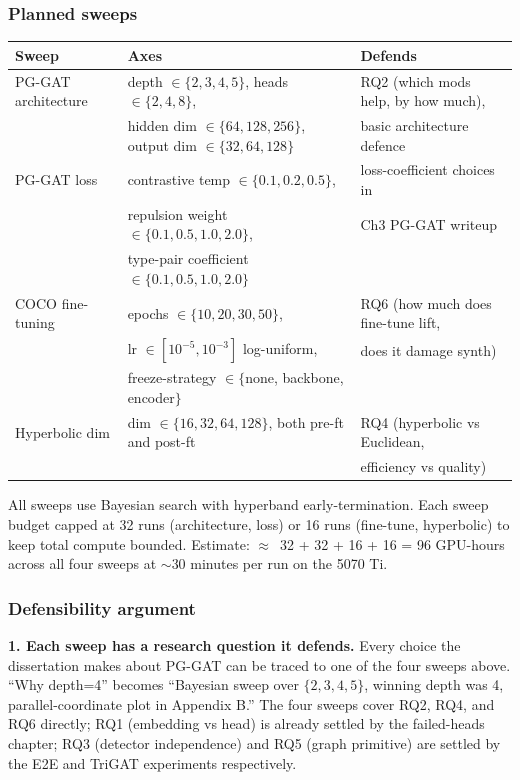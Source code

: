 \subsubsection{Planned sweeps}

\begin{tabular}{lll}
\hline
\textbf{Sweep} & \textbf{Axes} & \textbf{Defends} \\
\hline
PG-GAT architecture & depth $\in \{2,3,4,5\}$, heads $\in \{2,4,8\}$, & RQ2 (which mods help, by how much), \\
                    & hidden dim $\in \{64,128,256\}$, output dim $\in \{32,64,128\}$ & basic architecture defence \\
PG-GAT loss        & contrastive temp $\in \{0.1, 0.2, 0.5\}$, & loss-coefficient choices in \\
                    & repulsion weight $\in \{0.1, 0.5, 1.0, 2.0\}$, & Ch3 PG-GAT writeup \\
                    & type-pair coefficient $\in \{0.1, 0.5, 1.0, 2.0\}$ & \\
COCO fine-tuning   & epochs $\in \{10,20,30,50\}$, & RQ6 (how much does fine-tune lift, \\
                    & lr $\in [10^{-5}, 10^{-3}]$ log-uniform, & does it damage synth) \\
                    & freeze-strategy $\in \{$none, backbone, encoder$\}$ & \\
Hyperbolic dim     & dim $\in \{16, 32, 64, 128\}$, both pre-ft and post-ft & RQ4 (hyperbolic vs Euclidean,  \\
                    & & efficiency vs quality)\\
\hline
\end{tabular}

\vspace{0.5em}

All sweeps use Bayesian search with hyperband early-termination. Each sweep budget capped at 32 runs (architecture, loss) or 16 runs (fine-tune, hyperbolic) to keep total compute bounded. Estimate: $\approx$~32 + 32 + 16 + 16 = 96 GPU-hours across all four sweeps at $\sim$30 minutes per run on the 5070 Ti.

\subsubsection{Defensibility argument}

\textbf{1. Each sweep has a research question it defends.} Every choice the dissertation makes about PG-GAT can be traced to one of the four sweeps above. ``Why depth=4'' becomes ``Bayesian sweep over $\{2,3,4,5\}$, winning depth was 4, parallel-coordinate plot in Appendix B.'' The four sweeps cover RQ2, RQ4, and RQ6 directly; RQ1 (embedding vs head) is already settled by the failed-heads chapter; RQ3 (detector independence) and RQ5 (graph primitive) are settled by the E2E and TriGAT experiments respectively.

